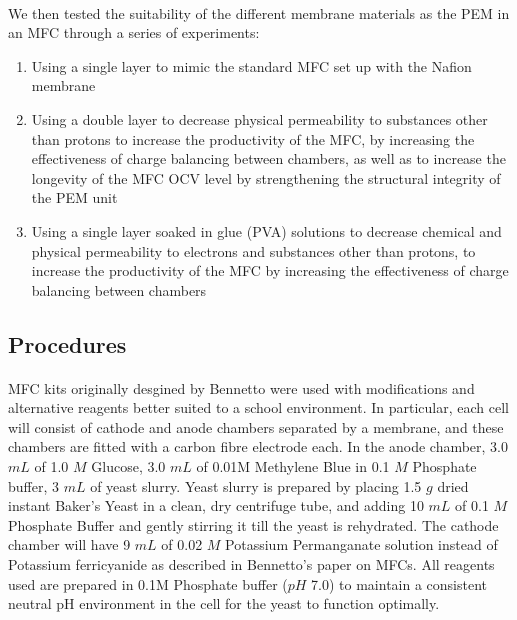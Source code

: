\documentclass[12pt, twocolumn, a4paper]{article}
\begin{document}
\paragraph{}We then tested the suitability of the different membrane materials as the PEM in an MFC through a series of experiments: 
    \begin{enumerate}
        \item Using a single layer to mimic the standard MFC set up with the Nafion\texttrademark{} membrane
        \item Using a double layer to decrease physical permeability to substances other than protons to increase the productivity of the MFC, by increasing the effectiveness of charge balancing between chambers, as well as to increase the longevity of the MFC OCV level by strengthening the structural integrity of the PEM unit
        \item Using a single layer soaked in glue (PVA) solutions to decrease chemical and physical permeability to electrons and substances other than protons, to increase the productivity of the MFC by increasing the effectiveness of charge balancing between chambers
    \end{enumerate}
    \subsection{Procedures}
        \paragraph{}MFC kits originally desgined by Bennetto \cite{bennetto1990electricity} were used with modifications and alternative reagents \cite{educsci12060417} better suited to a school environment. In particular, each cell will consist of cathode and anode chambers separated by a membrane, and these chambers are fitted with a carbon fibre electrode each. In the anode chamber, 3.0 $mL$ of 1.0 $M$ Glucose, 3.0 $mL$ of 0.01M Methylene Blue in 0.1 $M$ Phosphate buffer, 3 $mL$ of yeast slurry. Yeast slurry is prepared by placing 1.5 $g$ dried instant Baker's Yeast in a clean, dry centrifuge tube, and adding 10 $mL$ of 0.1 $M$ Phosphate Buffer and gently stirring it till the yeast is rehydrated. The cathode chamber will have 9 $mL$ of 0.02 $M$ Potassium Permanganate solution instead of Potassium ferricyanide as described in Bennetto's paper on MFCs. All reagents used are prepared in 0.1M Phosphate buffer ($pH$ 7.0) to maintain a consistent neutral pH environment in the cell for the yeast to function optimally. 
        
\end{document}
